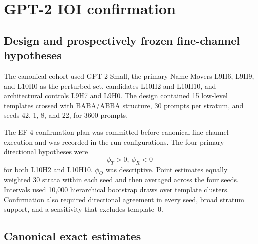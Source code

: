 \documentclass[preprint,12pt,authoryear]{elsarticle}
\begin{document}
\section{GPT-2 IOI confirmation}

\subsection{Design and prospectively frozen fine-channel hypotheses}

The canonical cohort used GPT-2 Small, the primary Name Movers L9H6, L9H9, and
L10H0 as the perturbed set, candidates L10H2 and L10H10, and architectural controls
L9H7 and L9H0. The design contained 15 low-level templates crossed with BABA/ABBA
structure, 30 prompts per stratum, and seeds 42, 1, 8, and 22, for 3600 prompts.

The EF-4 confirmation plan was committed before canonical fine-channel
execution and was recorded in the run configurations. The four primary
directional hypotheses were
\[
\phi_T>0,\ \phi_R<0
\]
for both L10H2 and L10H10. $\phi_O$ was descriptive. Point estimates equally
weighted 30 strata within each seed and then averaged across the four seeds.
Intervals used 10{,}000 hierarchical bootstrap draws over template clusters.
Confirmation also required directional agreement in every seed, broad stratum
support, and a sensitivity that excludes template~0.

\subsection{Canonical exact estimates}
\end{document}
